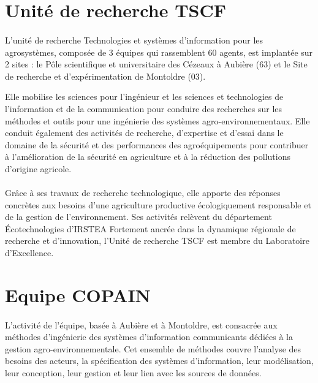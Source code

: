 \section{Unité de recherche \gls{TSCF}}
\paragraph{}
L’unité de recherche Technologies et systèmes d’information pour les agrosystèmes, composée de 3 équipes qui rassemblent 60 agents, est implantée sur 2 sites : le Pôle scientifique et universitaire des Cézeaux à Aubière (63) et le Site de recherche et d’expérimentation de Montoldre (03). 

Elle mobilise les sciences pour l’ingénieur et les sciences et technologies de l’information et de la communication pour conduire des recherches sur les méthodes et outils pour une ingénierie des systèmes agro-environnementaux. 
\newline
Elle conduit également des activités de recherche, d’expertise et d’essai dans le domaine de la sécurité et des performances des agroéquipements pour contribuer à l’amélioration de la sécurité en agriculture et à la réduction des pollutions d’origine agricole. 
\paragraph{}
Grâce à ses travaux de recherche technologique, elle apporte des réponses concrètes aux besoins d’une agriculture productive écologiquement responsable et de la gestion de l’environnement. Ses activités relèvent du département Écotechnologies d'IRSTEA 
\newline
Fortement ancrée dans la dynamique régionale de recherche et d’innovation, l’Unité de recherche TSCF est membre du Laboratoire d'Excellence. 

\section{Equipe \gls{COPAIN}}
\paragraph{}
L’activité de l’équipe, basée à Aubière et à Montoldre, est consacrée aux méthodes d’ingénierie des systèmes d’information communicants dédiées à la gestion agro-environnementale. Cet ensemble de méthodes couvre l’analyse des besoins des acteurs, la spécification des systèmes d’information, leur modélisation, leur conception, leur gestion et leur lien avec les sources de données. 
